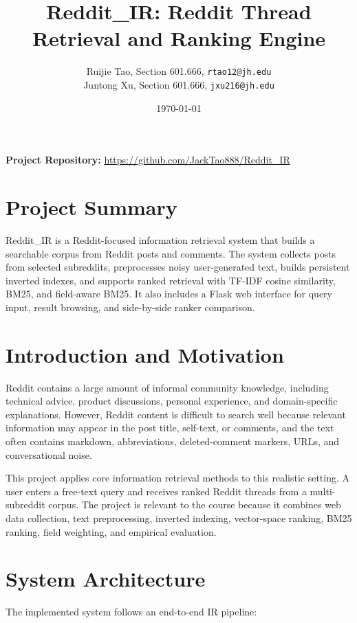 \documentclass[11pt]{article}
\title{Reddit\_IR: Reddit Thread Retrieval and Ranking Engine}
\author{
    Ruijie Tao, Section 601.666, \texttt{rtao12@jh.edu} \\
    Juntong Xu, Section 601.666, \texttt{jxu216@jh.edu}
}
\date{\today}
\begin{document}
\maketitle

\begin{center}
\textbf{Project Repository:} \url{https://github.com/JackTao888/Reddit_IR}
\end{center}

\section*{Project Summary}
Reddit\_IR is a Reddit-focused information retrieval system that builds a searchable corpus from Reddit posts and comments. The system collects posts from selected subreddits, preprocesses noisy user-generated text, builds persistent inverted indexes, and supports ranked retrieval with TF-IDF cosine similarity, BM25, and field-aware BM25. It also includes a Flask web interface for query input, result browsing, and side-by-side ranker comparison.

\section{Introduction and Motivation}
Reddit contains a large amount of informal community knowledge, including technical advice, product discussions, personal experience, and domain-specific explanations. However, Reddit content is difficult to search well because relevant information may appear in the post title, self-text, or comments, and the text often contains markdown, abbreviations, deleted-comment markers, URLs, and conversational noise.

This project applies core information retrieval methods to this realistic setting. A user enters a free-text query and receives ranked Reddit threads from a multi-subreddit corpus. The project is relevant to the course because it combines web data collection, text preprocessing, inverted indexing, vector-space ranking, BM25 ranking, field weighting, and empirical evaluation.

\section{System Architecture}
The implemented system follows an end-to-end IR pipeline:
\end{document}
